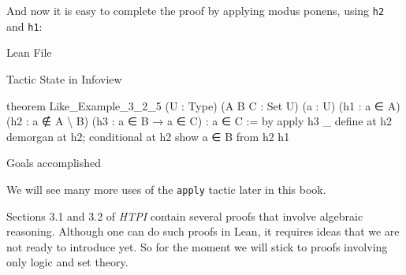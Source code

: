 \documentclass[
  letterpaper,
  DIV=11,
  numbers=noendperiod]{scrreprt}
\newenvironment{Shaded}{\begin{snugshade}}{\end{snugshade}}
\newcommand{\KeywordTok}[1]{\textcolor[rgb]{0.00,0.23,0.31}{#1}}
\newcommand{\NormalTok}[1]{\textcolor[rgb]{0.00,0.23,0.31}{#1}}
\newcommand{\SpecialCharTok}[1]{\textcolor[rgb]{0.37,0.37,0.37}{#1}}
\renewcommand{\KeywordTok}[1]{\textcolor[HTML]{0000FF}{#1}}
\renewcommand{\SpecialCharTok}[1]{}
\begin{document}
And now it is easy to complete the proof by applying modus ponens, using
\texttt{h2} and \texttt{h1}:

Lean File

Tactic State in Infoview

\begin{Shaded}
\begin{Highlighting}[]
\KeywordTok{theorem}\NormalTok{ Like\_Example\_3\_2\_5}
\NormalTok{(U : Type) (A B C : Set U) (a : U)}
\NormalTok{(h1 : a ∈ A) (h2 : a ∉ A \textbackslash{} B)}
\NormalTok{(h3 : a ∈ B → a ∈ C) : a ∈ C := }\KeywordTok{by}
  \KeywordTok{apply}\NormalTok{ h3 \_}
  \KeywordTok{define} \KeywordTok{at}\NormalTok{ h2}
  \KeywordTok{demorgan} \KeywordTok{at}\NormalTok{ h2; }\KeywordTok{conditional} \KeywordTok{at}\NormalTok{ h2}
  \KeywordTok{show}\NormalTok{ a ∈ B }\KeywordTok{from}\NormalTok{ h2 h1}
\end{Highlighting}
\end{Shaded}

\begin{Shaded}
\begin{Highlighting}[]
\SpecialCharTok{{-}}\NormalTok{Goals accomplished 🎉}
\end{Highlighting}
\end{Shaded}

We will see many more uses of the \texttt{apply} tactic later in this
book.

Sections 3.1 and 3.2 of \emph{HTPI} contain several proofs that involve
algebraic reasoning. Although one can do such proofs in Lean, it
requires ideas that we are not ready to introduce yet. So for the moment
we will stick to proofs involving only logic and set theory.
\end{document}
